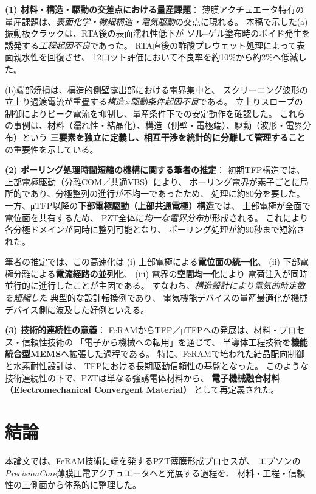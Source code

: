 \documentclass[conference]{IEEEtran}
\begin{document}
\medskip
\noindent
\textbf{(1) 材料・構造・駆動の交差点における量産課題}：
薄膜アクチュエータ特有の量産課題は、\emph{表面化学・微細構造・電気駆動}の交点に現れる。
本稿で示した(a)振動板クラックは、RTA後の表面濡れ性低下が
ソル–ゲル塗布時のボイド発生を誘発する\emph{工程起因不良}であった。
RTA直後の酢酸プレウェット処理によって表面親水性を回復させ、
12ロット評価において不良率を約10\%から約2\%へ低減した。

(b)端部焼損は、構造的側壁露出部における電界集中と、
スクリーニング波形の立上り過渡電流が重畳する\emph{構造×駆動条件起因不良}である。
立上りスロープの制御によりピーク電流を抑制し、量産条件下での安定動作を確認した。
これらの事例は、材料（濡れ性・結晶化）、構造（側壁・電極端）、駆動（波形・電界分布）という
\textbf{三要素を独立に定義し、相互干渉を統計的に分離して管理すること}の重要性を示している。

\medskip
\noindent
\textbf{(2) ポーリング処理時間短縮の機構に関する筆者の推定}：
初期TFP構造では、上部電極駆動（分離COM／共通VBS）により、
ポーリング電界が素子ごとに局所的であり、分極整列の進行が不均一であったため、
処理に約80分を要した。
一方、μTFP以降の\textbf{下部電極駆動（上部共通電極）構造}では、
上部電極が全面で電位面を共有するため、
PZT全体に\emph{均一な電界分布}が形成される。
これにより各分極ドメインが同時に整列可能となり、
ポーリング処理が約90秒まで短縮された。

筆者の推定では、この高速化は
(i) 上部電極による\textbf{電位面の統一化}、
(ii) 下部電極分離による\textbf{電流経路の並列化}、
(iii) 電界の\textbf{空間均一化}により
電荷注入が同時並行的に進行したことが主因である。
すなわち、\emph{構造設計により電気的時定数を短縮した}
典型的な設計転換例であり、
電気機能デバイスの量産最適化が機械デバイス側に波及した好例といえる。

\medskip
\noindent
\textbf{(3) 技術的連続性の意義}：
FeRAMからTFP／μTFPへの発展は、材料・プロセス・信頼性技術の
「電子から機械への転用」を通じて、
半導体工程技術を\textbf{機能統合型MEMS}へ拡張した過程である。
特に、FeRAMで培われた結晶配向制御と水素耐性設計は、
TFPにおける長期駆動信頼性の基盤となった。
このような技術連続性の下で、PZTは単なる強誘電体材料から、
\textbf{電子機械融合材料（Electromechanical Convergent Material）}
として再定義された。

\section{結論}
本論文では、FeRAM技術に端を発するPZT薄膜形成プロセスが、
エプソンの\textit{PrecisionCore}薄膜圧電アクチュエータへと発展する過程を、
材料・工程・信頼性の三側面から体系的に整理した。
\end{document}
